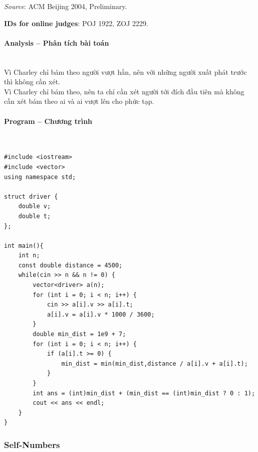 \documentclass{article}
\begin{document}
\textit{Source}: ACM Beijing 2004, Preliminary.

\textbf{IDs for online judges}: POJ 1922, ZOJ 2229.


\paragraph{Analysis -- Phân tích bài toán} \mbox{} \\

Vì Charley chỉ bám theo người vượt hắn, nên với những người xuất phát trước thì không cần xét. \\
Vì Charley chỉ bám theo, nên ta chỉ cần xét người tới đích đầu tiên mà không cần xét bám theo ai và ai vượt lên cho phức tạp.


\paragraph{Program -- Chương trình} \mbox{} \\


\begin{lstlisting}
#include <iostream>
#include <vector>
using namespace std;

struct driver {
	double v;
	double t;
};

int main(){
	int n;
	const double distance = 4500; 
	while(cin >> n && n != 0) {
		vector<driver> a(n);
		for (int i = 0; i < n; i++) {
			cin >> a[i].v >> a[i].t;
			a[i].v = a[i].v * 1000 / 3600;
		}
		double min_dist = 1e9 + 7;
		for (int i = 0; i < n; i++) {
			if (a[i].t >= 0) {
				min_dist = min(min_dist,distance / a[i].v + a[i].t); 
			}
		}
		int ans = (int)min_dist + (min_dist == (int)min_dist ? 0 : 1);
		cout << ans << endl;
	}
}
\end{lstlisting}


\subsubsection{Self-Numbers}
\end{document}
